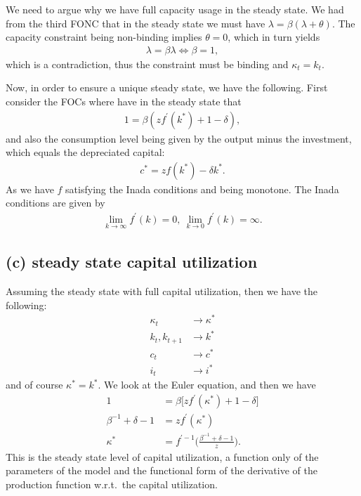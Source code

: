 \documentclass[a4paper]{article}
\theoremstyle{definition}
\begin{document}
We need to argue why we have full capacity usage in the steady state. We had from the third FONC that in the steady state we must have $\lambda = \beta (\lambda+\theta)$. The capacity constraint being non-binding implies $\theta = 0$, which in turn yields
	\begin{align*}
	\lambda = \beta \lambda \Leftrightarrow \beta = 1,
	\end{align*}
which is a contradiction, thus the constraint must be binding and $\kappa_t = k_t$. 	

Now, in order to ensure a unique steady state, we have the following. First consider the FOCs where have in the steady state that
	\begin{align*}
	1 = \beta (z f^\prime(k^*)+1-\delta),
	\end{align*}
and also the consumption level being given by the output minus the investment, which equals the depreciated capital:
	\begin{align*}
	c^* = z f(k^*) - \delta k^*.
	\end{align*}	
As we have $f$ satisfying the Inada conditions and being monotone. The Inada conditions are given by
	\begin{align*}
	\lim\limits_{k\rightarrow\infty}f^\prime(k)=0,\ \lim\limits_{k\rightarrow0} f^\prime(k) = \infty.
	\end{align*}	
\subsection{(c) steady state capital utilization}
Assuming the steady state with full capital utilization, then we have the following:
	\begin{align*}
	\kappa_t 					&\rightarrow \kappa^* \\
	k_t ,k_{t+1}				&\rightarrow k^* \\
	c_t 						&\rightarrow c^* \\
	i_t 							&\rightarrow i^* 
	\end{align*}
and of course $\kappa^* = k^*$. We look at the Euler equation, and then we have
	\begin{align*}
	1 							&= \beta \big[ z f^\prime(\kappa^*)+1-\delta \big] \\
	\beta^{-1} +\delta-1	&= z f^\prime (\kappa^*) \\
	\kappa^* 				&= f^{\prime -1} \Big( \frac{\beta^{-1} + \delta - 1}{z} \Big).
	\end{align*}	
This is the steady state level of capital utilization, a function only of the parameters of the model and the functional form of the derivative of the production function w.r.t.\ the capital utilization.	
\end{document}
